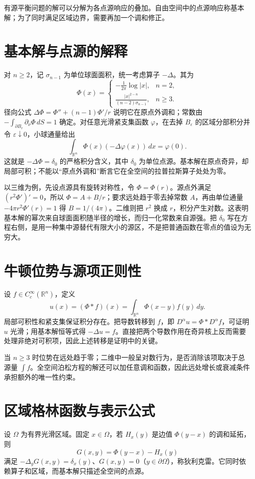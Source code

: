 \documentclass[UTF8,12pt,a4paper,fontset=fandol]{ctexbook}
\begin{document}
有源平衡问题的解可以分解为各点源响应的叠加。自由空间中的点源响应称基本解；为了同时满足区域边界，需要再加一个调和修正。

\section{基本解与点源的解释}
对 $n\ge2$，记 $\sigma_{n-1}$ 为单位球面面积，统一考虑算子 $-\Delta$。其为
\begin{equation}
 \Phi(x)=\begin{cases}
 \displaystyle-\frac1{2\pi}\log|x|,&n=2,\\
 \displaystyle\frac{|x|^{2-n}}{(n-2)\sigma_{n-1}},&n\ge3.
 \end{cases}
 \label{eq:laplace-fundamental}
\end{equation}
径向公式 $\Delta\Phi=\Phi''+(n-1)\Phi'/r$ 说明它在原点外调和；常数由 $-\int_{\partial B_r}\partial_\nu\Phi\,dS=1$ 确定。对任意光滑紧支集函数 $\varphi$，在去掉 $B_\varepsilon$ 的区域分部积分并令 $\varepsilon\downarrow0$，小球通量给出
\[
 \int_{\mathbb R^n}\Phi(x)(-\Delta\varphi(x))\,dx=\varphi(0).
\]
这就是 $-\Delta\Phi=\delta_0$ 的严格积分含义，其中 $\delta_0$ 为单位点源。基本解在原点奇异，却局部可积；不能以“原点外调和”断言它在全空间的拉普拉斯算子处处为零。

以三维为例，先设点源具有旋转对称性，令 $\Phi=\Phi(r)$。源点外满足 $(r^2\Phi')'=0$，所以 $\Phi=A+B/r$；要求远处趋于零去掉常数 $A$，再由单位通量 $-4\pi r^2\Phi'(r)=1$ 得 $B=1/(4\pi)$。二维则把 $r^2$ 换成 $r$，积分产生对数。这表明基本解的幂次来自球面面积随半径的增长，而归一化常数来自源强。把 $\delta_0$ 写在方程右侧，是用一种集中源替代有限大小的源区，不是把普通函数在零点的值设为无穷大。

\section{牛顿位势与源项正则性}
设 $f\in C_c^\infty(\mathbb R^n)$，定义
\[
 u(x)=(\Phi*f)(x)=\int_{\mathbb R^n}\Phi(x-y)f(y)\,dy.
\]
局部可积性和紧支集保证积分存在。把导数转移到 $f$，即 $D^\alpha u=\Phi*D^\alpha f$，可证明 $u$ 光滑；用基本解恒等式得 $-\Delta u=f$。直接把两个导数作用在奇异核上反而需要处理非绝对可积项，因此上述转移是证明中的关键。

当 $n\ge3$ 时位势在远处趋于零；二维中一般呈对数行为，是否消除该项取决于总源量 $\int f$。全空间泊松方程的解还可以加任意调和函数，因此远处增长或衰减条件承担额外的唯一性约束。

\section{区域格林函数与表示公式}
设 $\Omega$ 为有界光滑区域。固定 $x\in\Omega$，若 $H_x(y)$ 是边值 $\Phi(y-x)$ 的调和延拓，则
\[
 G(x,y)=\Phi(y-x)-H_x(y)
\]
满足 $-\Delta_yG(x,y)=\delta_x(y)$、$G(x,y)=0$（$y\in\partial\Omega$），称狄利克雷。它同时依赖算子和区域，而基本解只描述全空间的点源。
\end{document}
